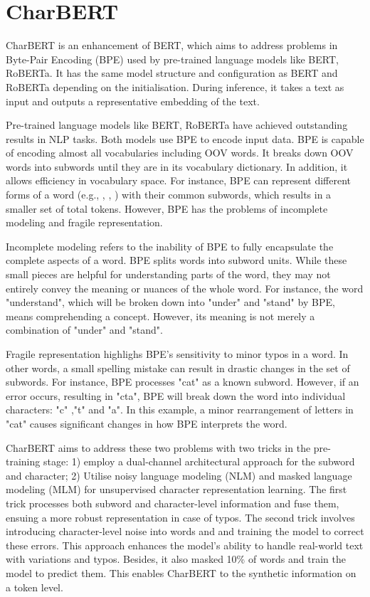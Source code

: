 \section{CharBERT}
\label{sec:2_charbert}
CharBERT \citep{ma2020charbert} is an enhancement of BERT, which aims to address problems in Byte-Pair Encoding (BPE) used by pre-trained language models like BERT, RoBERTa. It has the same model structure and configuration as BERT and RoBERTa depending on the initialisation. During inference, it takes a text as input and outputs a representative embedding of the text.

Pre-trained language models like BERT, RoBERTa have achieved outstanding results in NLP tasks. Both models use BPE to encode input data. BPE is capable of encoding almost all vocabularies including OOV words. It breaks down OOV words into subwords until they are in its vocabulary dictionary. In addition, it allows efficiency in vocabulary space. For instance, BPE can represent different forms of a word (e.g., , , ) with their common subwords, which results in a smaller set of total tokens. However, BPE has the problems of incomplete modeling and fragile representation. 

Incomplete modeling refers to the inability of BPE to fully encapsulate the complete aspects of a word. BPE splits words into subword units. While these small pieces are helpful for understanding parts of the word, they may not entirely convey the meaning or nuances of the whole word. For instance, the word "understand", which will be broken down into "under" and "stand" by BPE, means comprehending a concept. However, its meaning is not merely a combination of "under" and "stand". 

Fragile representation highlighs BPE's sensitivity to minor typos in a word. In other words, a small spelling mistake can result in drastic changes in the set of subwords. For instance, BPE processes "cat" as a known subword. However, if an error occurs, resulting in "cta", BPE will break down the word into individual characters: "c" ,"t" and "a". In this example, a minor rearrangement of letters in "cat" causes significant changes in how BPE interprets the word.

CharBERT aims to address these two problems with two tricks in the pre-training stage: 1) employ a dual-channel architectural approach for the subword and character; 2) Utilise noisy language modeling (NLM) and masked language modeling (MLM) for unsupervised character representation learning. The first trick processes both subword and character-level information and fuse them, ensuing a more robust representation in case of typos. The second trick involves introducing character-level noise into words and and training the model to correct these errors. This approach enhances the model's ability to handle real-world text with variations and typos. Besides, it also masked 10\% of words and train the model to predict them. This enables CharBERT to the synthetic information on a token level.

